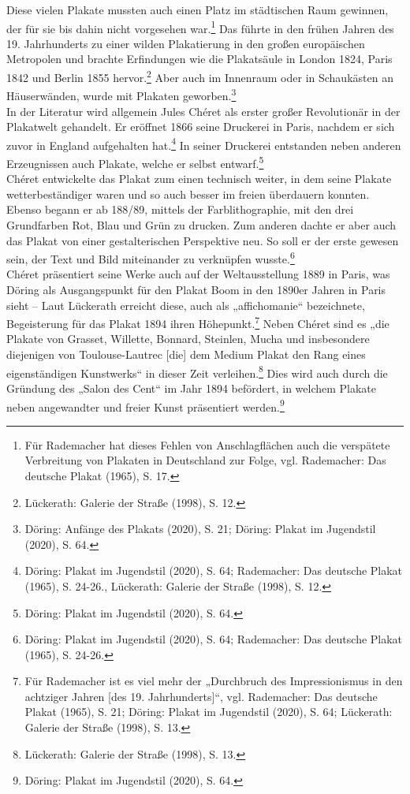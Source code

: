 \documentclass[a4paper,12pt,ngerman]{article}
\begin{document}
Diese vielen Plakate mussten auch einen Platz im städtischen Raum gewinnen, der für sie bis dahin nicht vorgesehen war.\footnote{Für Rademacher hat dieses Fehlen von Anschlagflächen auch die verspätete Verbreitung von Plakaten in Deutschland zur Folge, vgl. Rademacher: Das deutsche Plakat (1965), S. 17.}  Das führte in den frühen Jahren des 19. Jahrhunderts zu einer wilden Plakatierung in den großen europäischen Metropolen und brachte Erfindungen wie die Plakatsäule in London 1824, Paris 1842 und Berlin 1855 hervor.\footnote{Lückerath: Galerie der Straße (1998), S. 12.}  Aber auch im Innenraum oder in Schaukästen an Häuserwänden, wurde mit Plakaten geworben.\footnote{Döring: Anfänge des Plakats (2020), S. 21; Döring: Plakat im Jugendstil (2020), S. 64.} \\
In der Literatur wird allgemein Jules Chéret als erster großer Revolutionär in der Plakatwelt gehandelt. Er eröffnet 1866 seine Druckerei in Paris, nachdem er sich zuvor in England aufgehalten hat.\footnote{Döring: Plakat im Jugendstil (2020), S. 64; Rademacher: Das deutsche Plakat (1965), S. 24-26., Lückerath: Galerie der Straße (1998), S. 12.}  In seiner Druckerei entstanden neben anderen Erzeugnissen auch Plakate, welche er selbst entwarf.\footnote{Döring: Plakat im Jugendstil (2020), S. 64.} \\
Chéret entwickelte das Plakat zum einen technisch weiter, in dem seine Plakate wetterbeständiger waren und so auch besser im freien überdauern konnten. Ebenso begann er ab 188/89, mittels der Farblithographie, mit den drei Grundfarben Rot, Blau und Grün zu drucken. Zum anderen dachte er aber auch das Plakat von einer gestalterischen Perspektive neu. So soll er der erste gewesen sein, der Text und Bild miteinander zu verknüpfen wusste.\footnote{Döring: Plakat im Jugendstil (2020), S. 64; Rademacher: Das deutsche Plakat (1965), S. 24-26.} \\
Chéret präsentiert seine Werke auch auf der Weltausstellung 1889 in Paris, was Döring als Ausgangspunkt für den Plakat Boom in den 1890er Jahren in Paris sieht – Laut Lückerath erreicht diese, auch als „affichomanie“ bezeichnete, Begeisterung für das Plakat 1894 ihren Höhepunkt.\footnote{Für Rademacher ist es viel mehr der „Durchbruch des Impressionismus in den achtziger Jahren [des 19. Jahrhunderts]“, vgl. Rademacher: Das deutsche Plakat (1965), S. 21; Döring: Plakat im Jugendstil (2020), S. 64; Lückerath: Galerie der Straße (1998), S. 13.}  Neben Chéret sind es „die Plakate von Grasset, Willette, Bonnard, Steinlen, Mucha und insbesondere diejenigen von Toulouse-Lautrec [die] dem Medium Plakat den Rang eines eigenständigen Kunstwerks“ in dieser Zeit verleihen.\footnote{Lückerath: Galerie der Straße (1998), S. 13.}  Dies wird auch durch die Gründung des „Salon des Cent“ im Jahr 1894 befördert, in welchem Plakate neben angewandter und freier Kunst präsentiert werden.\footnote{Döring: Plakat im Jugendstil (2020), S. 64.} \\
\end{document}
